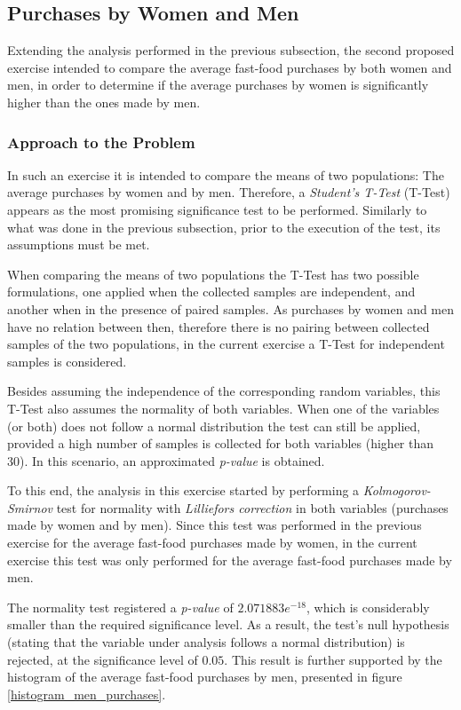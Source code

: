 \documentclass[12pt]{article}
\begin{document}
\subsection{Purchases by Women and Men}

Extending the analysis performed in the previous subsection, the second proposed exercise intended to compare the average fast-food purchases by both women and men, in order to determine if the average purchases by women is significantly higher than the ones made by men.

\subsubsection{Approach to the Problem}

In such an exercise it is intended to compare the means of two populations: The average purchases by women and by men. Therefore, a \emph{Student's T-Test} (T-Test) appears as the most promising significance test to be performed. Similarly to what was done in the previous subsection, prior to the execution of the test, its assumptions must be met.

When comparing the means of two populations the T-Test has two possible formulations, one applied when the collected samples are independent, and another when in the presence of paired samples. As purchases by women and men have no relation between then, therefore there is no pairing between collected samples of the two populations, in the current exercise a T-Test for independent samples is considered.

Besides assuming the independence of the corresponding random variables, this T-Test also assumes the normality of both variables. When one of the variables (or both) does not follow a normal distribution the test can still be applied, provided a high number of samples is collected for both variables (higher than 30). In this scenario, an approximated \emph{p-value} is obtained.

To this end, the analysis in this exercise started by performing a \emph{Kolmogorov-Smirnov} test for normality with \emph{Lilliefors correction} in both variables (purchases made by women and by men). Since this test was performed in the previous exercise for the average fast-food purchases made by women, in the current exercise this test was only performed for the average fast-food purchases made by men.

The normality test registered a \emph{p-value} of $2.071883e^{-18}$, which is considerably smaller than the required significance level. As a result, the test's null hypothesis (stating that the variable under analysis follows a normal distribution) is rejected, at the significance level of $0.05$. This result is further supported by the histogram of the average fast-food purchases by men, presented in figure \ref{histogram_men_purchases}.
\end{document}
